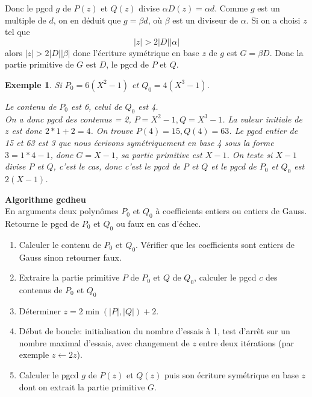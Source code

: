 \documentclass[a4paper,11pt]{article}
\newtheorem{example}[thm]{Exemple}
\begin{document}
\begin{giacjshere}
\begin{itemize}
  
  Donc le pgcd $g$ de $P ( z )$ et $Q ( z )$ divise $\alpha D ( z ) = \alpha
  d$. Comme $g$ est un multiple de $d$, on en déduit que $g = \beta d$, où
  $\beta$ est un diviseur de $\alpha$. Si on a choisi $z$ tel que
  \[ | z | > 2 | D | | \alpha | \]
  alors $| z | > 2 | D | | \beta |$ donc l'écriture symétrique en base $z$ de
  $g$ est $G = \beta D$. Donc la partie primitive de $G$ est $D$, le
  pgcd de $P$ et $Q$.
  
  
\end{itemize}
\begin{example}
  Si $P_0 = 6 ( X^2 - 1 )$ et $Q_0 = 4 ( X^3 - 1 )$.
  
  Le contenu de $P_0$ est 6, celui de $Q_0$ est 4.\\
  On a donc pgcd des contenus = 2, $P = X^2 - 1, Q = X^3 - 1$. La valeur
  initiale de $z$ est donc $2 \ast 1 + 2 = 4$. On trouve $P ( 4 ) = 15, Q ( 4
  ) = 63$. Le pgcd entier de 15 et 63 est 3 que nous écrivons symétriquement
  en base 4 sous la forme $3 = 1 \ast 4 - 1$, donc $G = X - 1$, sa partie
  primitive est $X - 1$. On teste si $X - 1$ divise $P$ et $Q$, c'est le cas,
  donc c'est le pgcd de $P$ et $Q$ et le pgcd de $P_0$ et $Q_0$ est $2 ( X - 1
  )$.
\end{example}

{\bf Algorithme gcdheu}\\
En arguments deux polynômes $P_0$ et $Q_0$ à coefficients entiers ou entiers
de Gauss. Retourne le pgcd de 
$P_0$ et $Q_0$ ou faux en cas d'échec.
\begin{enumerate}
  \item Calculer le contenu de $P_0$ et $Q_0$. Vérifier que les coefficients
  sont entiers de Gauss sinon retourner faux.
  
  \item Extraire la partie primitive $P$ de $P_0$ et $Q$ de $Q_0$, calculer le
  pgcd $c$ des contenus de $P_0$ et $Q_0$
  
  \item Déterminer $z = 2 \min ( | P |, | Q | ) + 2$.
  
  \item Début de boucle: initialisation du nombre d'essais à 1, test d'arrêt
  sur un nombre maximal d'essais, avec changement de $z$ entre deux itérations
  (par exemple $z \leftarrow 2 z$).
  
  \item Calculer le pgcd $g$ de $P ( z )$ et $Q ( z )$ puis son écriture
  symétrique en base $z$ dont on extrait la partie primitive $G$.
  

\end{enumerate}
\end{giacjshere}
\end{document}
